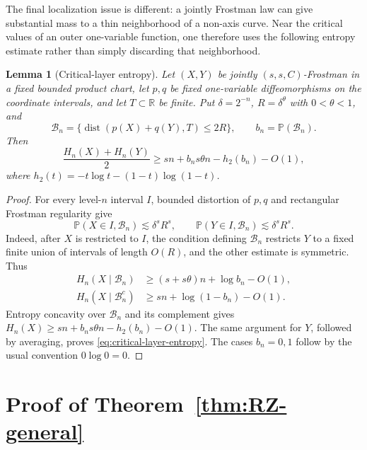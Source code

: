 \documentclass[11pt]{article}
\newtheorem{lemma}[theorem]{Lemma}
\begin{document}
The final localization issue is different: a jointly Frostman law
can give substantial mass to a thin neighborhood of a non-axis
curve.  Near the critical values of an outer one-variable function,
one therefore uses the following entropy estimate rather than simply
discarding that neighborhood.

\begin{lemma}[Critical-layer entropy]
\label{lem:critical-layer}
Let \((X,Y)\) be jointly \((s,s,C)\)-Frostman in a fixed bounded
product chart, let \(p,q\) be fixed one-variable diffeomorphisms on
the coordinate intervals, and let \(T\subset\mathbb R\) be finite.  Put
\(\delta=2^{-n}\), \(R=\delta^\theta\) with \(0<\theta<1\), and
\begin{equation}
 \mathcal B_n=
 \{\operatorname{dist}(p(X)+q(Y),T)\le2R\},
 \qquad b_n=\mathbb P(\mathcal B_n).
 \label{eq:critical-layer}
\end{equation}
Then
\begin{equation}
 \frac{H_n(X)+H_n(Y)}{2}
 \ge sn+b_ns\theta n-h_2(b_n)-O(1),
 \label{eq:critical-layer-entropy}
\end{equation}
where \(h_2(t)=-t\log t-(1-t)\log(1-t)\).
\end{lemma}

\begin{proof}
For every level-\(n\) interval \(I\), bounded distortion of \(p,q\)
and rectangular Frostman regularity give
\begin{equation}
 \mathbb P(X\in I,\mathcal B_n)\lesssim\delta^sR^s,
 \qquad
 \mathbb P(Y\in I,\mathcal B_n)\lesssim\delta^sR^s.
 \label{eq:critical-layer-cell-cap}
\end{equation}
Indeed, after \(X\) is restricted to \(I\), the condition defining
\(\mathcal B_n\) restricts \(Y\) to a fixed finite union of
intervals of length \(O(R)\), and the other estimate is symmetric.
Thus
\begin{align*}
 H_n(X\mid\mathcal B_n)
 &\ge(s+s\theta)n+\log b_n-O(1),\\
 H_n(X\mid\mathcal B_n^c)
 &\ge sn+\log(1-b_n)-O(1).
\end{align*}
Entropy concavity over \(\mathcal B_n\) and its complement gives
\(
 H_n(X)\ge sn+b_ns\theta n-h_2(b_n)-O(1).
\)
The same argument for \(Y\), followed by averaging, proves
\eqref{eq:critical-layer-entropy}.  The cases \(b_n=0,1\) follow by
the usual convention \(0\log0=0\).
\end{proof}
\section{Proof of Theorem~\ref{thm:RZ-general}}
\label{sec:RZ-proof}
\end{document}
